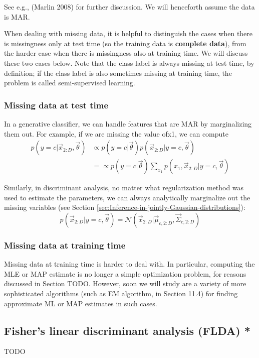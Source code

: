See e.g., (Marlin 2008) for further discussion. We will henceforth assume the data is MAR.

When dealing with missing data, it is helpful to distinguish the cases when there is missingness only at test time (so the training data is \textbf{complete data}), from the harder case when there is missingness also at training time. We will discuss these two cases below. Note that the class label is always missing at test time, by definition; if the class label is also sometimes missing at training time, the problem is called semi-supervised learning.


\subsubsection{Missing data at test time}
In a generative classifier, we can handle features that are MAR by marginalizing them out. For example, if we are missing the value ofx1, we can compute
\begin{align}
p(y=c|\vec{x}_{2:D},\vec{\theta}) & \propto p(y=c|\vec{\theta})p(\vec{x}_{2:D}|y=c,\vec{\theta}) \\
      & = \propto p(y=c|\vec{\theta})\sum\limits_{x_1}p(x_1, \vec{x}_{2:D}|y=c,\vec{\theta})
\end{align}

Similarly, in discriminant analysis, no matter what regularization method was used to estimate the parameters, we can always analytically marginalize out the missing variables (see Section \ref{sec:Inference-in-jointly-Gaussian-distributions}):
\begin{equation}
p(\vec{x}_{2:D}|y=c,\vec{\theta})=\mathcal{N}(\vec{x}_{2:D}|\vec{\mu}_{c,2:D},\vec{\Sigma}_{c,2:D})
\end{equation}


\subsubsection{Missing data at training time}
Missing data at training time is harder to deal with. In particular, computing the MLE or MAP estimate is no longer a simple optimization problem, for reasons discussed in Section TODO. However, soon we will study are a variety of more sophisticated algorithms (such as EM algorithm, in Section 11.4) for finding approximate ML or MAP estimates in such cases.


\subsection{Fisher’s linear discriminant analysis (FLDA) *}
TODO